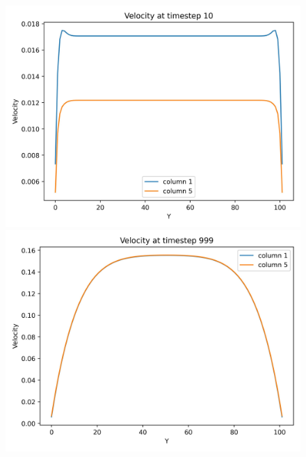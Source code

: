 \begin{figure}[H]
    \begin{minipage}{0.33\textwidth}
        \includegraphics[width=\linewidth]{graphs/PoiseuilleFlow/velocity_at_columns_for_step_10}
    \end{minipage}%
    \begin{minipage}{0.33\textwidth}
        \includegraphics[width=\linewidth]{graphs/PoiseuilleFlow/velocity_at_columns_for_step_999}
    \end{minipage}%
    \begin{minipage}{0.33\textwidth}

\end{minipage}
\end{figure}
